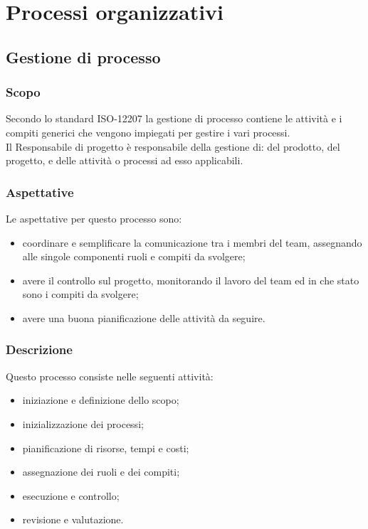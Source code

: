 \section{Processi organizzativi}

\subsection{Gestione di processo}

\subsubsection{Scopo}
Secondo lo standard ISO-12207 la gestione di processo contiene le attività e i compiti generici che vengono impiegati per gestire i vari processi.\\
Il Responsabile di progetto è responsabile della gestione di: del prodotto, del progetto, e delle attività o processi ad esso applicabili.
\subsubsection{Aspettative}
Le aspettative per questo processo sono:
\begin{itemize}
    \item coordinare e semplificare la comunicazione tra i membri del team, assegnando alle singole componenti ruoli e compiti da svolgere;
    \item avere il controllo sul progetto, monitorando il lavoro del team ed in che stato sono i compiti da svolgere;
    \item avere una buona pianificazione delle attività da seguire.
\end{itemize}

\subsubsection{Descrizione}
Questo processo consiste nelle seguenti attività:
\begin{itemize}
    \item iniziazione e definizione dello scopo;
    \item inizializzazione dei processi;
    \item pianificazione di risorse, tempi e costi;
    \item assegnazione dei ruoli e dei compiti;
    \item esecuzione e controllo;
    \item revisione e valutazione.
\end{itemize}

